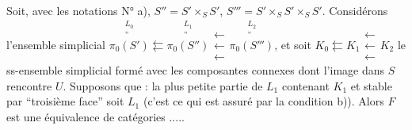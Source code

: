  Soit, avec les notations   N° a), $S''=S'\times_S S'$, $S'''=S'\times_S S'\times_S S'$. Considérons l'ensemble simplicial $\overset{\substack{L_0\\\text{''}}}{\pi_0(S')}\leftleftarrows\overset{\substack{L_1\\\text{''}}}{\pi_0(S'')}\mathrel{\substack{\leftarrow\\[-.65ex]\leftarrow\\[-.65ex]\leftarrow}}\overset{\substack{L_2\\\text{''}}}{\pi_0(S''')}$,  et  soit $K_0\leftleftarrows K_1\mathrel{\substack{\leftarrow\\[-.65ex]\leftarrow\\[-.65ex]\leftarrow}} K_2$ le ss-ensemble simplicial formé avec les composantes connexes dont l'image dans $S$ rencontre $U$. Supposons \unsure{:} que :   la plus petite partie de $L_1$ contenant $K_1$ et stable par ``troisième face'' soit $L_1$ (c'est ce qui est assuré par la condition b)). Alors $F$ est  une équivalence de catégories .....

